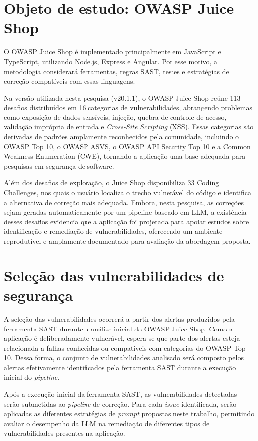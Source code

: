 \section{Objeto de estudo: OWASP Juice Shop}

O OWASP Juice Shop é implementado principalmente em JavaScript e TypeScript, utilizando Node.js, Express e Angular. Por esse motivo, a metodologia considerará ferramentas, regras SAST, testes e estratégias de correção compatíveis com essas linguagens.

Na versão utilizada nesta pesquisa (v20.1.1), o OWASP Juice Shop reúne 113 desafios distribuídos em 16 categorias de vulnerabilidades, abrangendo problemas como exposição de dados sensíveis, injeção, quebra de controle de acesso, validação imprópria de entrada e \textit{Cross-Site Scripting} (XSS). Essas categorias são derivadas de padrões amplamente reconhecidos pela comunidade, incluindo o OWASP Top 10, o OWASP ASVS, o OWASP API Security Top 10 e a Common Weakness Enumeration (CWE), tornando a aplicação uma base adequada para pesquisas em segurança de software.

Além dos desafios de exploração, o Juice Shop disponibiliza 33 Coding Challenges, nos quais o usuário localiza o trecho vulnerável do código e identifica a alternativa de correção mais adequada. Embora, nesta pesquisa, as correções sejam geradas automaticamente por um pipeline baseado em LLM, a existência desses desafios evidencia que a aplicação foi projetada para apoiar estudos sobre identificação e remediação de vulnerabilidades, oferecendo um ambiente reprodutível e amplamente documentado para avaliação da abordagem proposta.

\section{Seleção das vulnerabilidades de segurança}

A seleção das vulnerabilidades ocorrerá a partir dos alertas produzidos pela ferramenta SAST durante a análise inicial do OWASP Juice Shop. Como a aplicação é deliberadamente vulnerável, espera-se que parte dos alertas esteja relacionada a falhas conhecidas ou compatíveis com categorias do OWASP Top 10. Dessa forma, o conjunto de vulnerabilidades analisado será composto pelos alertas efetivamente identificados pela ferramenta SAST durante a execução inicial do \textit{pipeline}.

Após a execução inicial da ferramenta SAST, as vulnerabilidades detectadas serão submetidas ao \textit{pipeline} de correção. Para cada \textit{issue} identificada, serão aplicadas as diferentes estratégias de \textit{prompt} propostas neste trabalho, permitindo avaliar o desempenho da LLM na remediação de diferentes tipos de vulnerabilidades presentes na aplicação.

